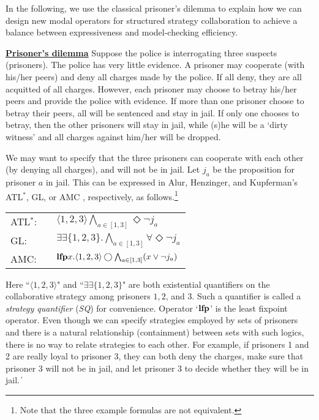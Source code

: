 \documentclass[11pt]{article}
\newcommand{\existsb}{\mbox{$\exists\!\!\exists$}}
\newcommand{\emlfp}{\mbox{\bf lfp}}
\newcommand{\pevt}{\Diamond}
\newcommand{\nxt}{\bigcirc}
\def\qed{\ifmmode\|\else{\unskip\nobreak\hfil
\penalty50\hskip1em\null\nobreak\hfil$\blacksquare$
\parfillskip=0pt\finalhyphendemerits=0\endgraf}\fi}
\begin{document}
In the following, we use the classical prisoner's dilemma to explain how we can 
design new modal operators for structured strategy collaboration to 
achieve a balance between expressiveness and model-checking efficiency.

{\example \label{exmp.pd} 
\underline{\bf Prisoner's dilemma}} 
Suppose the police is interrogating 
three suspects (prisoners).  
The police has very little evidence.  
A prisoner may cooperate (with his/her peers) and deny all charges made by the police. 
If all deny, they are all acquitted of all charges.  
However, each prisoner may choose to betray his/her peers
and provide the police with evidence.
If more than one prisoner choose to betray their peers, all will be sentenced and stay in jail.
If only one chooses to betray, then the other prisoners will stay in jail, while (s)he will be a `dirty witness' and all charges against him/her will be dropped.

We may want to specify that the three prisoners can cooperate with each other (by denying all charges), and will not be in jail.  
Let $j_a$ be the proposition for prisoner $a$ in jail.  
This can be expressed in Alur, Henzinger, and Kupferman's 
ATL$^*$,  
GL, or AMC \cite{AHK02}, respectively, as follows.\footnote{Note 
that the three example formulas are not equivalent.}  
\begin{center} 
\begin{tabular}{lll} 
ATL$^*$: 
& &  $\langle 1,2,3\rangle\bigwedge_{a\in[1,3]}\pevt \neg j_a$ \\
GL: 
& & $\existsb\{1,2,3\}.\bigwedge_{a\in[1,3]}\forall\pevt\neg j_a$ \\
AMC: 
& & $\emlfp x.\langle 1,2,3\rangle \nxt 
\bigwedge_{a\in[1,3]}(x\vee \neg j_a)$
\end{tabular} 
\end{center} 
Here ``$\langle 1,2,3\rangle$" and 
``$\existsb\{1,2,3\}$" are both existential 
quantifiers on the collaborative strategy among prisoners $1,2$, and $3$.  
Such a quantifier is called a {\em strategy quantifier} ({\em SQ}) 
for convenience.  
Operator `$\emlfp$' is the least fixpoint operator.  
Even though we can specify strategies employed by sets of prisoners and 
there is a natural relationship (containment) between sets with such logics, 
there is no way to relate strategies to each other.  
For example, if prisoners 1 and 2 are really loyal to prisoner 3, 
they can both deny the charges,  
make sure that prisoner 3 will not be in jail, and let prisoner 3 
to decide whether they will be in jail. 
\qed 
\end{document}
